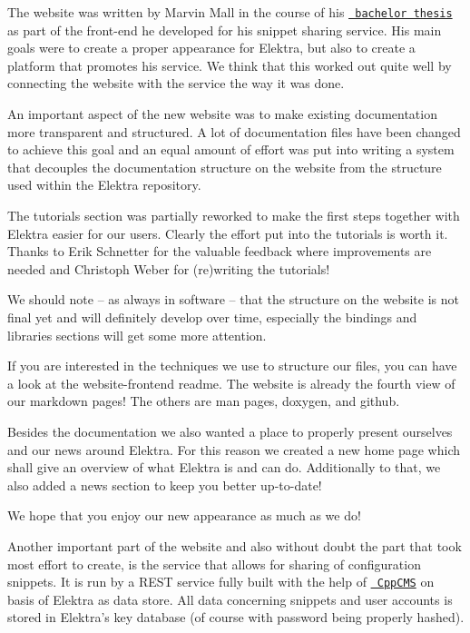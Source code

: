 The website was written by Marvin Mall in the course of his \href{https://www.libelektra.org/ftp/elektra/mall2016rest.pdf}{\texttt{ bachelor thesis}} as part of the front-\/end he developed for his snippet sharing service. His main goals were to create a proper appearance for Elektra, but also to create a platform that promotes his service. We think that this worked out quite well by connecting the website with the service the way it was done.

An important aspect of the new website was to make existing documentation more transparent and structured. A lot of documentation files have been changed to achieve this goal and an equal amount of effort was put into writing a system that decouples the documentation structure on the website from the structure used within the Elektra repository.

The tutorials section was partially reworked to make the first steps together with Elektra easier for our users. Clearly the effort put into the tutorials is worth it. Thanks to Erik Schnetter for the valuable feedback where improvements are needed and Christoph Weber for (re)writing the tutorials!

We should note -- as always in software -- that the structure on the website is not final yet and will definitely develop over time, especially the bindings and libraries sections will get some more attention.

If you are interested in the techniques we use to structure our files, you can have a look at the website-\/frontend readme. The website is already the fourth view of our markdown pages! The others are man pages, doxygen, and github.

Besides the documentation we also wanted a place to properly present ourselves and our news around Elektra. For this reason we created a new home page which shall give an overview of what Elektra is and can do. Additionally to that, we also added a news section to keep you better up-\/to-\/date!

We hope that you enjoy our new appearance as much as we do!

Another important part of the website and also without doubt the part that took most effort to create, is the service that allows for sharing of configuration snippets. It is run by a R\+E\+ST service fully built with the help of \href{http://cppcms.com/}{\texttt{ Cpp\+C\+MS}} on basis of Elektra as data store. All data concerning snippets and user accounts is stored in Elektra’s key database (of course with password being properly hashed).

